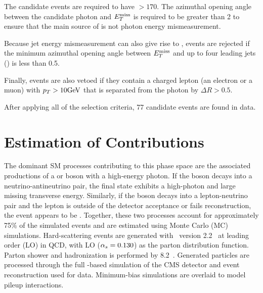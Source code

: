 

The candidate events are required to have \met $> 170$\GeV.
The azimuthal opening
angle between the candidate photon and $E_T^{\mathrm{miss}}$ is required to be
greater than 2 to ensure that the main source of \met is not photon
energy mismeasurement.  

Because jet energy mismeasurement can also
give rise to \met, events are rejected if the minimum azimuthal opening
angle between $E_T^{\mathrm{miss}}$ and up to four leading jets (\minDphiMETj) is
less than 0.5.

Finally, events are also vetoed if they contain 
 a charged lepton (an electron or a muon) with $p_T >
10\mathrm{GeV}$ that is separated from the photon by $\Delta R > 0.5$.

After applying all of the selection criteria, 77 candidate events are 
found in data.

\section{Estimation of Contributions}

The dominant SM processes contributing to this 
 phase space are the associated productions of a \z
 or \w boson with a high-energy photon. 
If the \z boson decays into a  neutrino-antineutrino pair, 
 the final state exhibits a high-\et photon and large
 missing transverse energy. 
Similarly, if the \w boson decays into a lepton-neutrino
 pair and  the lepton is outside of the detector acceptance
 or fails reconstruction, the event appears to be \gmet.
 Together, these two processes account for approximately
  75\% of the simulated events and are
 estimated using Monte Carlo (MC) simulations. 
Hard-scattering events are generated with \MGfiveAMC\
  version 2.2~\cite{Alwall:2014hca} at leading order (LO) in QCD,
 with  \NNPDFthree LO ($\alpha_s = 0.130$) as the parton distribution function.
Parton shower and hadronization is performed by \PYTHIA{}8.2~\cite{Sjostrand:2014zea}.
Generated particles are processed through the full \GEANT-based simulation of the CMS 
 detector \cite{GEANT, GEANTdev} and event reconstruction used for data. 
Minimum-bias simulations are overlaid to model pileup interactions.

